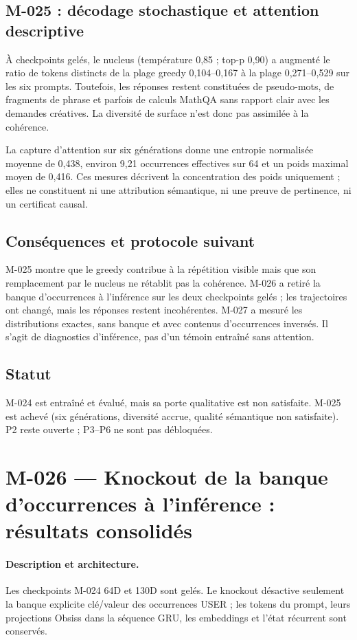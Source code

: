 \documentclass[11pt,a4paper]{report}
\begin{document}
\subsection{M-025 : décodage stochastique et attention descriptive}
À checkpoints gelés, le nucleus (température 0,85 ; top-p 0,90) a augmenté le ratio de tokens distincts de la plage greedy 0,104--0,167 à la plage 0,271--0,529 sur les six prompts. Toutefois, les réponses restent constituées de pseudo-mots, de fragments de phrase et parfois de calculs MathQA sans rapport clair avec les demandes créatives. La diversité de surface n'est donc pas assimilée à la cohérence.

La capture d'attention sur six générations donne une entropie normalisée moyenne de 0,438, environ 9,21 occurrences effectives sur 64 et un poids maximal moyen de 0,416. Ces mesures décrivent la concentration des poids uniquement ; elles ne constituent ni une attribution sémantique, ni une preuve de pertinence, ni un certificat causal.

\subsection{Conséquences et protocole suivant}
M-025 montre que le greedy contribue à la répétition visible mais que son remplacement par le nucleus ne rétablit pas la cohérence. M-026 a retiré la banque d'occurrences à l'inférence sur les deux checkpoints gelés ; les trajectoires ont changé, mais les réponses restent incohérentes. M-027 a mesuré les distributions exactes, sans banque et avec contenus d'occurrences inversés. Il s'agit de diagnostics d'inférence, pas d'un témoin entraîné sans attention.

\subsection{Statut}
M-024 est entraîné et évalué, mais sa porte qualitative est non satisfaite. M-025 est achevé (six générations, diversité accrue, qualité sémantique non satisfaite). P2 reste ouverte ; P3--P6 ne sont pas débloquées.



\section{M-026 — Knockout de la banque d'occurrences à l'inférence : résultats consolidés}
\label{sec:m026-knockout-complete}
\paragraph{Description et architecture.} Les checkpoints M-024 64D et 130D sont gelés. Le knockout désactive seulement la banque explicite clé/valeur des occurrences USER ; les tokens du prompt, leurs projections Obsiss dans la séquence GRU, les embeddings et l'état récurrent sont conservés.
\end{document}
